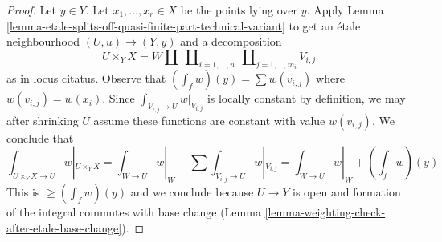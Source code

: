 \documentclass[10pt,a4paper]{amsart}
\theoremstyle{plain}
\theoremstyle{definition}
\theoremstyle{remark}
\numberwithin{equation}{subsection}
\begin{document}
\begin{proof}
Let $y \in Y$. Let $x_1, \ldots, x_r \in X$ be the points lying over $y$.
Apply
Lemma \ref{lemma-etale-splits-off-quasi-finite-part-technical-variant}
to get an \'etale neighbourhood $(U, u) \to (Y, y)$ and a decomposition
$$
U \times_Y X =
W \amalg
\ \coprod\nolimits_{i = 1, \ldots, n}
\ \coprod\nolimits_{j = 1, \ldots, m_i}
V_{i, j}
$$
as in locus citatus. Observe that $(\int_f w)(y) = \sum w(v_{i, j})$
where $w(v_{i, j}) = w(x_i)$. Since $\int_{V_{i, j} \to U} w|_{V_{i, j}}$
is locally constant by definition, we may after shrinking $U$
assume these functions are constant with value $w(v_{i, j})$.
We conclude that
$$
\textstyle{\int}_{U \times_Y X \to U} w|_{U \times_Y X} =
\textstyle{\int}_{W \to U} w|_W +
\sum \textstyle{\int}_{V_{i, j} \to U} w|_{V_{i, j}} =
\textstyle{\int}_{W \to U} w|_W + (\int_f w)(y)
$$
This is $\geq (\int_f w)(y)$ and we conclude because $U \to Y$
is open and formation of the integral commutes with base change
(Lemma \ref{lemma-weighting-check-after-etale-base-change}).
\end{proof}
\end{document}
